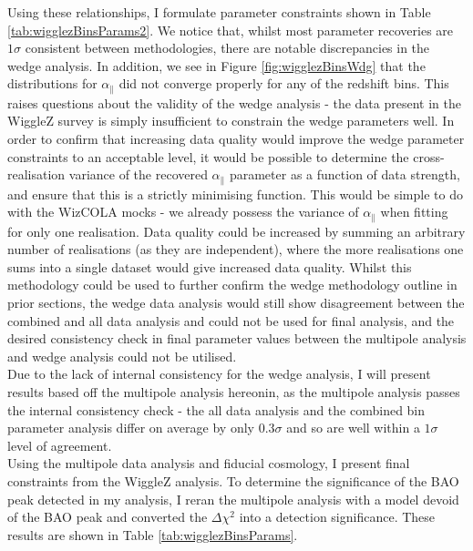 \documentclass[titlesmallcaps, examinerscopy, copyrightpage]{uqthesis}
\begin{document}
Using these relationships, I formulate parameter constraints shown in Table \ref{tab:wigglezBinsParams2}. We notice that, whilst most parameter recoveries are $1\sigma$ consistent between methodologies, there are notable discrepancies in the wedge analysis. In addition, we see in Figure \ref{fig:wigglezBinsWdg} that the distributions for $\alpha_\parallel$ did not converge properly for any of the redshift bins. This raises questions about the validity of the wedge analysis - the data present in the WiggleZ survey is simply insufficient to constrain the wedge parameters well. In order to confirm that increasing data quality would improve the wedge parameter constraints to an acceptable level, it would be possible to determine the cross-realisation variance of the recovered $\alpha_\parallel$ parameter as a function of data strength, and ensure that this is a strictly minimising function. This would be simple to do with the WizCOLA mocks - we already possess the variance of $\alpha_\parallel$ when fitting for only one realisation. Data quality could be increased by summing an arbitrary number of realisations (as they are independent), where the more realisations one sums into a single dataset would give increased data quality. Whilst this methodology could be used to further confirm the wedge methodology outline in prior sections, the wedge data analysis would still show disagreement between the combined and all data analysis and could not be used for final analysis, and the desired consistency check in final parameter values between the multipole analysis and wedge analysis could not be utilised.\\




Due to the lack of internal consistency for the wedge analysis, I will present results based off the multipole analysis hereonin, as the multipole analysis passes the internal consistency check - the all data analysis and the combined bin parameter analysis differ on average by only $0.3\sigma$ and so are well within a $1\sigma$ level of agreement.\\



Using the multipole data analysis and fiducial cosmology, I present final constraints from the WiggleZ analysis. To determine the significance of the BAO peak detected in my analysis, I reran the multipole analysis with a model devoid of the BAO peak and converted the $\Delta \chi^2$ into a detection significance. These results are shown in Table \ref{tab:wigglezBinsParams}.
\end{document}
